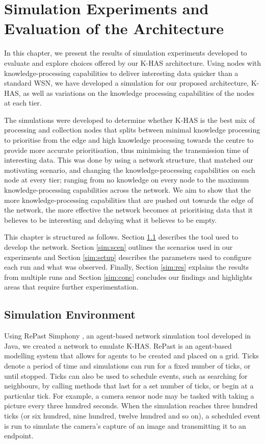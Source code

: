 \chapter{Simulation Experiments and Evaluation of the Architecture}
In this chapter, we present the results of simulation experiments developed to evaluate and explore choices offered by our K-HAS architecture. Using nodes with knowledge-processing capabilities to deliver interesting data quicker than a standard WSN, we have developed a simulation for our proposed architecture, K-HAS, as well as variations on the knowledge processing capabilities of the nodes at each tier.

The simulations were developed to determine whether K-HAS is the best mix of processing and collection nodes that splits between minimal knowledge processing to prioritise from the edge and high knowledge processing towards the centre to provide more accurate prioritisation, thus minimising the transmission time of interesting data. This was done by using a network structure, that matched our motivating scenario, and changing the knowledge-processing capabilities on each node at every tier; ranging from no knowledge on every node to the maximum knowledge-processing capabilities across the network. We aim to show that the more knowledge-processing capabilities that are pushed out towards the edge of the network, the more effective the network becomes at prioritising data that it believes to be interesting and delaying what it believes to be empty.

This chapter is structured as follows. Section \ref{sim:env} describes the tool used to develop the network. Section \ref{sim:scen} outlines the scenarios used in our experiments and Section \ref{sim:setup} describes the parameters used to configure each run and what was observed. Finally, Section \ref{sim:res} explains the results from multiple runs and Section \ref{sim:conc} concludes our findings and highlights areas that require further experimentation.

\section{Simulation Environment}\label{sim:env}
Using RePast Simphony \cite{Collier2003}, an agent-based network simulation tool developed in Java, we created a network to emulate K-HAS. RePast is an agent-based modelling system that allows for agents to be created and placed on a grid. Ticks denote a period of time and simulations can run for a fixed number of ticks, or until stopped. Ticks can also be used to schedule events, such as searching for neighbours, by calling methods that last for a set number of ticks, or begin at a particular tick. For example, a camera sensor node may be tasked with taking a picture every three hundred seconds. When the simulation reaches three hundred ticks (or six hundred, nine hundred, twelve hundred and so on), a scheduled event is run to simulate the camera's capture of an image and transmitting it to an endpoint.

